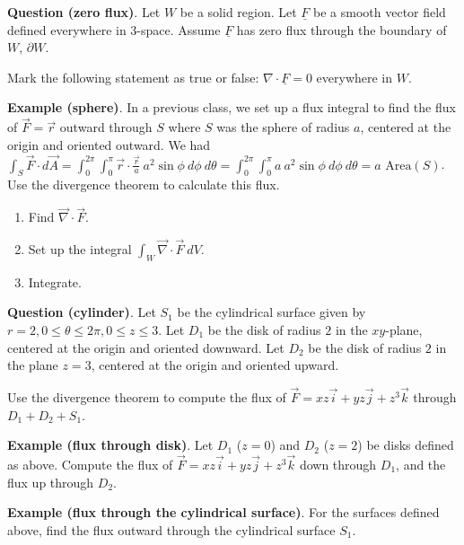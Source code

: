 \documentclass[12pt,letterpaper,noanswers]{exam}
\begin{document}
\noindent\textbf{Question (zero flux)}.  Let $W$ be a solid region.  Let $\underline F$ be a smooth vector field defined everywhere in $3$-space.  Assume $\underline F$ has zero flux through the boundary of $W$, $\partial W$.

Mark the following statement as true or false: $\nabla \cdot \underline F = 0$ everywhere in $W$.
\vspace{1in}

\noindent\textbf{Example (sphere)}.  In a previous class, we set up a flux integral to find the flux of $\vec F = \vec r$ outward through $S$ where $S$ was the sphere of radius $a$, centered at the origin and oriented outward.  We had $\displaystyle \int_S \vec F\cdot d\vec A = \int_0^{2\pi}\int_0^{\pi} \vec r\cdot \frac{\vec r}{a} \ a^2\sin\phi\  d\phi\ d\theta = \int_0^{2\pi}\int_0^{\pi} a \ a^2\sin\phi\  d\phi\ d\theta = a\text{ Area}(S)$.
Use the divergence theorem to calculate this flux.
\begin{enumerate}
\itemsep3em
    \item Find $\vec\nabla \cdot \vec F$.
    \item Set up the integral $\int_W \vec\nabla \cdot \vec F\ dV$.
    \item Integrate.
    \vspace{1in}
\end{enumerate}


\noindent\textbf{Question (cylinder)}.  Let $S_1$ be the cylindrical surface given by $r = 2, 0\leq \theta\leq 2\pi, 0\leq z\leq 3$.  Let $D_1$ be the disk of radius $2$ in the $xy$-plane, centered at the origin and oriented downward.  Let $D_2$ be the disk of radius $2$ in the plane $z=3$, centered at the origin and oriented upward.  

Use the divergence theorem to compute the flux of $\vec F = xz\vec i + yz\vec j + z^3\vec k$ through $D_1+D_2+S_1$.

\vspace{3in}


\noindent\textbf{Example (flux through disk)}.  Let $D_1$ ($z=0$) and $D_2$ ($z=2$) be disks defined as above.  Compute the flux of $\vec F = xz\vec i + yz\vec j + z^3\vec k$ down through $D_1$, and the flux up through $D_2$.  

\vspace{2in}


\noindent\textbf{Example (flux through the cylindrical surface)}.  For the surfaces defined above, find the flux outward through the cylindrical surface $S_1$.
\vspace{1.5in}
\end{document}
